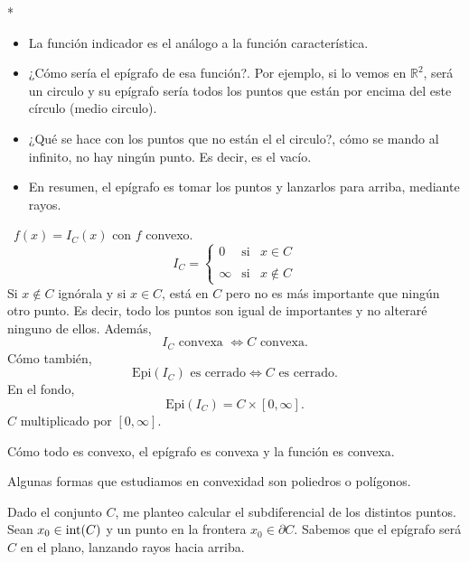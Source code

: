 \begin{paracol}{2}
\switchcolumn[1]*{\noindent\scriptsize
    \begin{itemize}
	\item La función indicador es el análogo a la función característica.
	\item ¿Cómo sería el epígrafo de esa función?. Por ejemplo, si lo vemos en $\mathbb{R}^2$, será un circulo y su epígrafo sería todos los puntos que están por encima del este círculo (medio circulo).
	\item ¿Qué se hace con los puntos que no están el el circulo?, cómo se mando al infinito, no hay ningún punto. Es decir, es el vacío. 
	\item En resumen, el epígrafo es tomar los puntos y lanzarlos para arriba, mediante rayos.
    \end{itemize}
}
\switchcolumn[0]\noindent
\begin{ejem}\,
    $f(x)=I_C(x)$ con $f$ convexo.
    $$
    I_C=\left\{
	\begin{array}{rcl}
	    0 &\text{si} & x\in C\\\\
	    \infty & \text{si} & x\notin C
	\end{array}
    \right.
    $$
    Si $x\notin C$ ignórala y si $x\in C$, está en $C$ pero no es más importante que ningún otro punto. Es decir, todo los  puntos son igual de importantes y no alteraré ninguno de ellos. Además,
    $$I_C \text{ convexa } \iff C \text{ convexa}.$$
    Cómo también,
    $$\text{Epi}(I_C) \text{ es cerrado} \iff C \text{ es cerrado.}$$
    En el fondo,
    $$\text{Epi}(I_C)=C \times [0,\infty].$$
    $C$ multiplicado por $[0,\infty]$.

    Cómo todo es convexo, el epígrafo es convexa y la función es convexa.
\end{ejem}

\begin{tcolorbox}[colframe=white]
Algunas formas que estudiamos en convexidad son poliedros o polígonos.
\end{tcolorbox}
\begin{center}
\end{center}
Dado el conjunto $C$, me planteo calcular el subdiferencial de los distintos puntos. Sean $x_0\in \mathop{\mbox{\normalfont int}}\nolimits(C)$ y un punto en la frontera $x_0\in \partial C$. Sabemos que el epígrafo será $C$ en el plano, lanzando rayos hacia arriba.


\end{paracol}
